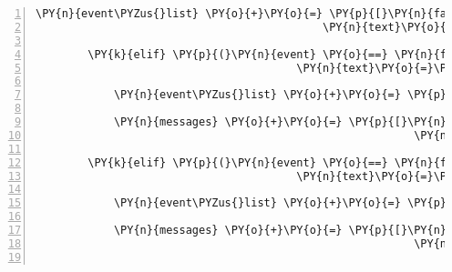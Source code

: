 \begin{Verbatim}[commandchars=\\\{\},numbers=left,firstnumber=1,stepnumber=1]
            \PY{n}{event\PYZus{}list} \PY{o}{+}\PY{o}{=} \PY{p}{[}\PY{n}{fabula}\PY{o}{.}\PY{n}{SaysEvent}\PY{p}{(}\PY{n}{identifier}\PY{o}{=}\PY{n}{ID\PYZus{}KUNI}\PY{p}{,}
                                            \PY{n}{text}\PY{o}{=}\PY{l+s}{\PYZsq{}}\PY{l+s}{Könnt ich fliegen würd ich da so oder so über den Fluss fliegen!}\PY{l+s}{\PYZsq{}}\PY{p}{)}\PY{p}{]}

        \PY{k}{elif} \PY{p}{(}\PY{n}{event} \PY{o}{==} \PY{n}{fabula}\PY{o}{.}\PY{n}{SaysEvent}\PY{p}{(}\PY{n}{identifier}\PY{o}{=}\PY{n}{ID\PYZus{}CASSANDRA}\PY{p}{,}
                                        \PY{n}{text}\PY{o}{=}\PY{l+s}{\PYZsq{}}\PY{l+s}{Entschuldigung, könntest du mal einen Schritt zur Seite gehen?}\PY{l+s}{\PYZsq{}}\PY{p}{)}\PY{p}{)}\PY{p}{:}

            \PY{n}{event\PYZus{}list} \PY{o}{+}\PY{o}{=} \PY{p}{[}\PY{n}{fabula}\PY{o}{.}\PY{n}{SaysEvent}\PY{p}{(}\PY{l+s}{\PYZsq{}}\PY{l+s}{spider}\PY{l+s}{\PYZsq{}}\PY{p}{,} \PY{l+s}{\PYZsq{}}\PY{l+s}{Rrrrrr! Ckkck!}\PY{l+s}{\PYZsq{}}\PY{p}{)}\PY{p}{]}

            \PY{n}{messages} \PY{o}{+}\PY{o}{=} \PY{p}{[}\PY{n}{fabula}\PY{o}{.}\PY{n}{Message}\PY{p}{(}\PY{p}{[}\PY{n}{fabula}\PY{o}{.}\PY{n}{SaysEvent}\PY{p}{(}\PY{n}{identifier}\PY{o}{=}\PY{n}{ID\PYZus{}CASSANDRA}\PY{p}{,}
                                                          \PY{n}{text}\PY{o}{=}\PY{l+s}{\PYZsq{}}\PY{l+s}{Oh, Entschuldigung ich wollte nicht stören!}\PY{l+s}{\PYZsq{}}\PY{p}{)}\PY{p}{]}\PY{p}{)}\PY{p}{]}

        \PY{k}{elif} \PY{p}{(}\PY{n}{event} \PY{o}{==} \PY{n}{fabula}\PY{o}{.}\PY{n}{SaysEvent}\PY{p}{(}\PY{n}{identifier}\PY{o}{=}\PY{n}{ID\PYZus{}CASSANDRA}\PY{p}{,}
                                        \PY{n}{text}\PY{o}{=}\PY{l+s}{\PYZsq{}}\PY{l+s}{Könntest du mich bitte mal vorbei lassen?}\PY{l+s}{\PYZsq{}}\PY{p}{)}\PY{p}{)}\PY{p}{:}

            \PY{n}{event\PYZus{}list} \PY{o}{+}\PY{o}{=} \PY{p}{[}\PY{n}{fabula}\PY{o}{.}\PY{n}{SaysEvent}\PY{p}{(}\PY{l+s}{\PYZsq{}}\PY{l+s}{spider}\PY{l+s}{\PYZsq{}}\PY{p}{,} \PY{l+s}{\PYZsq{}}\PY{l+s}{Du wärst aber eine leckere vollwertige Mahlzeit!}\PY{l+s}{\PYZsq{}}\PY{p}{)}\PY{p}{]}

            \PY{n}{messages} \PY{o}{+}\PY{o}{=} \PY{p}{[}\PY{n}{fabula}\PY{o}{.}\PY{n}{Message}\PY{p}{(}\PY{p}{[}\PY{n}{fabula}\PY{o}{.}\PY{n}{SaysEvent}\PY{p}{(}\PY{n}{identifier}\PY{o}{=}\PY{n}{ID\PYZus{}CASSANDRA}\PY{p}{,}
                                                          \PY{n}{text}\PY{o}{=}\PY{l+s}{\PYZsq{}}\PY{l+s}{Schnell weg!}\PY{l+s}{\PYZsq{}}\PY{p}{)}\PY{p}{]}\PY{p}{)}\PY{p}{]}


\end{Verbatim}
